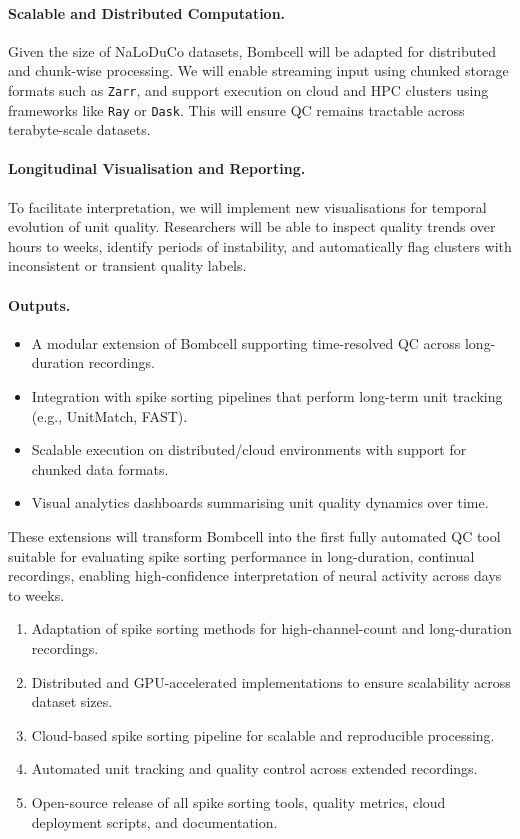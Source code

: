 \paragraph{Scalable and Distributed Computation.}
Given the size of NaLoDuCo datasets, Bombcell will be adapted for distributed and chunk-wise processing. We will enable streaming input using chunked storage formats such as \texttt{Zarr}, and support execution on cloud and HPC clusters using frameworks like \texttt{Ray} or \texttt{Dask}. This will ensure QC remains tractable across terabyte-scale datasets.

\paragraph{Longitudinal Visualisation and Reporting.}
To facilitate interpretation, we will implement new visualisations for temporal evolution of unit quality. Researchers will be able to inspect quality trends over hours to weeks, identify periods of instability, and automatically flag clusters with inconsistent or transient quality labels.

\paragraph{Outputs.}
\begin{itemize}
    \item A modular extension of Bombcell supporting time-resolved QC across long-duration recordings.
    \item Integration with spike sorting pipelines that perform long-term unit tracking (e.g., UnitMatch, FAST).
    \item Scalable execution on distributed/cloud environments with support for chunked data formats.
    \item Visual analytics dashboards summarising unit quality dynamics over time.
\end{itemize}

These extensions will transform Bombcell into the first fully automated QC tool suitable for evaluating spike sorting performance in long-duration, continual recordings, enabling high-confidence interpretation of neural activity across days to weeks.

\begin{enumerate}
    \item Adaptation of spike sorting methods for high-channel-count and long-duration recordings.
    \item Distributed and GPU-accelerated implementations to ensure scalability across dataset sizes.
    \item Cloud-based spike sorting pipeline for scalable and reproducible processing.
    \item Automated unit tracking and quality control across extended recordings.
    \item Open-source release of all spike sorting tools, quality metrics, cloud deployment scripts, and documentation.
\end{enumerate}
